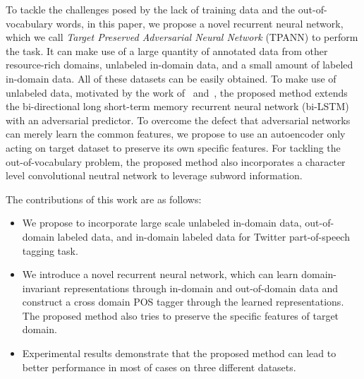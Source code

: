 \documentclass[11pt,letterpaper]{article}
\begin{document}
To tackle the challenges posed by the lack of training data and the out-of-vocabulary words, in this paper, we propose  a novel recurrent neural network, which we call \textit{Target Preserved Adversarial Neural Network} (TPANN) to perform the task. It can make use of a large quantity of annotated data from other resource-rich domains, unlabeled in-domain data, and a small amount of labeled in-domain data.  All of these datasets can be easily obtained. To make use of unlabeled data, motivated by the work of~\citet{goodfellow2014generative} and~\citet{chen2016adversarial}, the proposed method extends the bi-directional long short-term memory recurrent neural network (bi-LSTM) with an adversarial predictor. To overcome the defect that adversarial networks can merely learn the common features, we propose to use an autoencoder only acting on target dataset to preserve its own specific features. For tackling the out-of-vocabulary problem, the proposed method also incorporates a character level convolutional neutral network to leverage subword information. %




The contributions of this work are as follows:
\begin{itemize}
  \item We propose to incorporate large scale unlabeled in-domain data, out-of-domain labeled data, and in-domain labeled data for Twitter part-of-speech tagging task. 
  
  \item We introduce a novel recurrent neural network, which can learn domain-invariant representations through in-domain and out-of-domain data and construct a cross domain POS tagger through the learned representations. The proposed method also tries to preserve the specific features of target domain.
  \item Experimental results demonstrate that the proposed method can lead to better performance in most of cases on three different datasets.
\end{itemize}
\end{document}
